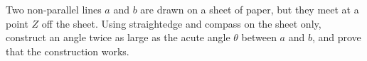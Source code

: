 Two non-parallel lines $a$ and $b$ are drawn on a sheet of paper, but they meet at a point $Z$ off the sheet. Using straightedge and compass on the sheet only, construct an angle twice as large as the acute angle $\theta$ between $a$ and $b$, and prove that the construction works.
